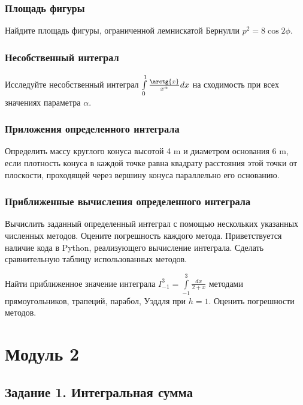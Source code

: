 \documentclass{article}
\renewcommand{\thesubsection}{Задание \arabic{subsection}.}
\begin{document}
\subsection{Площадь фигуры}

Найдите площадь фигуры, ограниченной лемнискатой Бернулли $p^2 = 8 \cos{2\phi}$.

\subsection{Несобственный интеграл}

Исследуйте несобственный интеграл $\int\limits_{0}^{1}\frac{\arctg{x}}{x^\alpha}dx$ на сходимость при всех значениях параметра $\alpha$.



\subsection{Приложения определенного интеграла}

Определить массу круглого конуса высотой 4 \si{\metre} и диаметром основания 6 \si{\metre}, если плотность конуса в каждой точке равна квадрату расстояния этой точки от плоскости, проходящей через вершину конуса параллельно его основанию.

\subsection{Приближенные вычисления определенного интеграла}

Вычислить заданный определенный интеграл с помощью нескольких указанных численных методов. Оцените погрешность каждого метода. Приветствуется наличие кода в Python, реализующего вычисление интеграла. Сделать сравнительную таблицу использованных методов.

Найти приближенное значение интеграла
$ I_{-1}^{3} = \int\limits_{-1}^{3}\frac{dx}{2+x} $
методами прямоугольников, трапеций, парабол, Уэддля при $h = 1$. Оценить погрешности методов.



\renewcommand{\thesubsection}{\arabic{subsection}.}

\chapter{Модуль 2}

\section{Задание 1. Интегральная сумма}
\end{document}
